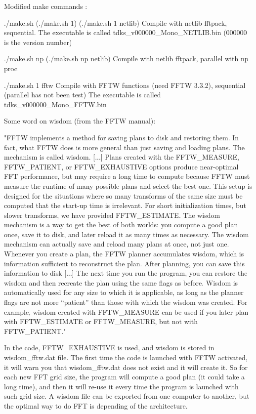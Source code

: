 Modified make commands :

./make.sh (./make.sh 1) (./make.sh 1 netlib) 
Compile with netlib fftpack, sequential. The executable is called tdks_v000000_Mono_NETLIB.bin (000000 is the version number)

./make.sh np (./make.sh np netlib)
Compile with netlib fftpack, parallel with np proc 

./make.sh 1 fftw
Compile with FFTW functions (need FFTW 3.3.2), sequential (parallel has not been test) The executable is called tdks_v000000_Mono_FFTW.bin

Some word on wisdom (from the FFTW manual):

"FFTW implements a method for saving plans to disk and restoring them. In fact, what
FFTW does is more general than just saving and loading plans. The mechanism is called
wisdom. [...]
Plans created with the FFTW_MEASURE, FFTW_PATIENT, or FFTW_EXHAUSTIVE options produce
near-optimal FFT performance, but may require a long time to compute because FFTW
must measure the runtime of many possible plans and select the best one. This setup is
designed for the situations where so many transforms of the same size must be computed
that the start-up time is irrelevant. For short initialization times, but slower transforms,
we have provided FFTW_ESTIMATE. The wisdom mechanism is a way to get the best of both
worlds: you compute a good plan once, save it to disk, and later reload it as many times as
necessary. The wisdom mechanism can actually save and reload many plans at once, not
just one.
Whenever you create a plan, the FFTW planner accumulates wisdom, which is information
sufficient to reconstruct the plan. After planning, you can save this information to disk
[...]
The next time you run the program, you can restore the wisdom and then recreate the plan using
the same flags as before.
Wisdom is automatically used for any size to which it is applicable, as long as the planner
flags are not more “patient” than those with which the wisdom was created. For example,
wisdom created with FFTW_MEASURE can be used if you later plan with FFTW_ESTIMATE or
FFTW_MEASURE, but not with FFTW_PATIENT."

In the code, FFTW_EXHAUSTIVE is used, and wisdom is stored in wisdom_fftw.dat file.
The first time the code is launched with FFTW activated, it will warn you that wisdom_fftw.dat does not exist and it will create it.
So for each new FFT grid size, the program will compute a good plan (it could take a long time), and then it will re-use it every time the program is launched with such grid size. A wisdom file can be exported from one computer to another, but the optimal way to do FFT is depending of the architecture.
